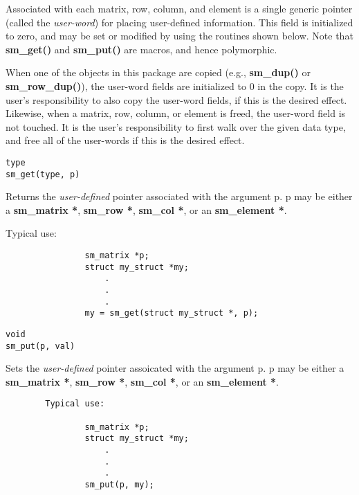 Associated with each matrix, row, column, and element is a single
generic pointer (called the {\em user-word}) for placing user-defined
information.  This field is initialized to zero, and may be set or
modified by using the routines shown below.  Note that {\bf sm\_get()} and
{\bf sm\_put()} are macros, and hence polymorphic.

When one of the objects in this package are
copied (e.g., {\bf sm\_dup()} or {\bf sm\_row\_dup()}), the
user-word fields are initialized to 0 in the copy.
It is the user's responsibility to also copy the user-word fields, if this
is the desired effect.  Likewise, when a matrix, row, column, or element
is freed, the user-word field is not touched.
It is the user's responsibility
to first walk over the given data type, and free all of the user-words
if this is the desired effect.



\begin{verbatim}
type
sm_get(type, p)
\end{verbatim}

        Returns the {\em user-defined} pointer
        associated with the argument p.  p may
        be either a
        {\bf sm\_matrix *}, {\bf sm\_row *}, {\bf sm\_col *},
        or an {\bf sm\_element *}.


        Typical use:

\begin{verbatim}
                sm_matrix *p;
                struct my_struct *my;
                    .
                    .
                    .
                my = sm_get(struct my_struct *, p);
\end{verbatim}


\begin{verbatim}
void
sm_put(p, val)
\end{verbatim}

        Sets the {\em user-defined} pointer assoicated with
        the argument p.  p may be either a
        {\bf sm\_matrix *}, {\bf sm\_row *}, {\bf sm\_col *},
        or an {\bf sm\_element *}.


\begin{verbatim}
        Typical use:

                sm_matrix *p;
                struct my_struct *my;
                    .
                    .
                    .
                sm_put(p, my);
\end{verbatim}

